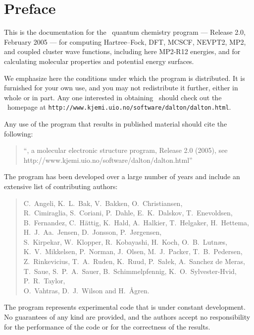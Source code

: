 \tableofcontents

\chapter*{Preface}

This is the documentation for the \dalton\ quantum chemistry program
--- Release 2.0, February 2005 --- for computing Hartree--Fock, DFT, 
MCSCF, NEVPT2,  MP2, and coupled cluster wave functions, including here MP2-R12 energies, and for calculating 
molecular properties and potential energy surfaces.

          We emphasize here the conditions under which the
program is distributed.  It is furnished for your own use,
and you may not redistribute it further, either in whole or in
part.  Any one interested in obtaining \dalton\ should check out the
\dalton\ homepage at
\verb|http://www.kjemi.uio.no/software/dalton/dalton.html|.

Any use of the program that results in published
material should cite the following:
\begin{quote}
``\dalton , a molecular electronic  structure program, Release
2.0 (2005), see http://www.kjemi.uio.no/software/dalton/dalton.html''
\end{quote}

The program has been developed over a large number of years and
include an extensive list of contributing authors:

\begin{quote}
C.~Angeli,
K.~L.~Bak,
V.~Bakken,
O.~Christiansen,\\
R.~Cimiraglia,
S.~Coriani,
P.~Dahle,
E.~K.~Dalskov,
T.~Enevoldsen,\\
B.~Fernandez,
C.~H{\"a}ttig,
K.~Hald,
A.~Halkier,
T.~Helgaker,
H.~Hettema,
H.~J.~Aa.~Jensen,
D.~Jonsson,
P.~J{\o}rgensen,\\
S.~Kirpekar,
W.~Klopper,
R.~Kobayashi,
H.~Koch,
O.~B.~Lutn\ae s,\\
K.~V.~Mikkelsen,
P.~Norman,
J.~Olsen,
M.~J.~Packer,
T.~B.~Pedersen,\\
Z.~Rinkevicius,
T.~A.~Ruden,
K.~Ruud,
P.~Sa\l ek,
A.~Sanchez de Meras,\\
T.~Saue,
S.~P.~A.~Sauer,
B.~Schimmelpfennig,
K.~O.~Sylvester-Hvid,
P.~R.~Taylor,\\
O.~Vahtras,
D.~J.~Wilson
and H.~{\AA}gren.
\end{quote}

          The program represents experimental code that is
under constant development.  No guarantees of any kind are
provided, and the authors accept no responsibility for the
performance of the code or for the correctness of the results.
